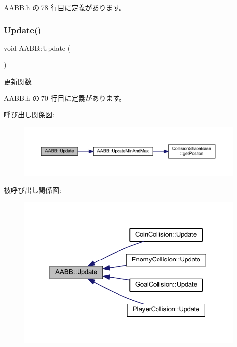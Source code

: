 A\+A\+B\+B.\+h の 78 行目に定義があります。

\mbox{\label{class_a_a_b_b_a9698fec7358275832b6b84a146ea4a7c}} 
\subsubsection{\texorpdfstring{Update()}{Update()}}
{\footnotesize\ttfamily void A\+A\+B\+B\+::\+Update (\begin{DoxyParamCaption}{ }\end{DoxyParamCaption})\hspace{0.3cm}{\ttfamily [inline]}}



更新関数 



 A\+A\+B\+B.\+h の 70 行目に定義があります。

呼び出し関係図\+:\nopagebreak
\begin{figure}[H]
\begin{center}
\leavevmode
\includegraphics[width=350pt]{class_a_a_b_b_a9698fec7358275832b6b84a146ea4a7c_cgraph}
\end{center}
\end{figure}
被呼び出し関係図\+:\nopagebreak
\begin{figure}[H]
\begin{center}
\leavevmode
\includegraphics[width=317pt]{class_a_a_b_b_a9698fec7358275832b6b84a146ea4a7c_icgraph}
\end{center}
\end{figure}
\mbox{\label{class_a_a_b_b_aad10f509f6726aed8285063a69df9085}} 
